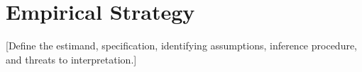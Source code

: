 \section{Empirical Strategy}

[Define the estimand, specification, identifying assumptions, inference procedure, and threats to interpretation.]
